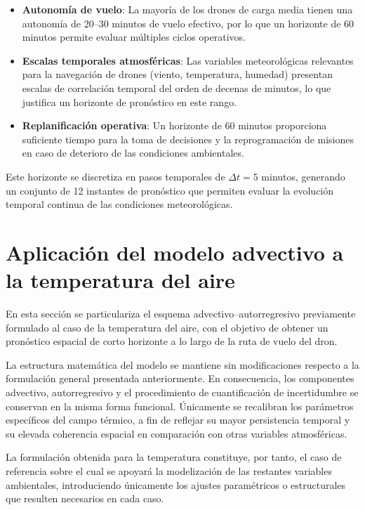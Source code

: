 \documentclass[
  spanish,
  us-letterpaper,
]{scrreprt}
\numberwithin{equation}{section}
\begin{document}
\begin{itemize}
\item
  \textbf{Autonomía de vuelo}: La mayoría de los drones de carga media
  tienen una autonomía de 20--30 minutos de vuelo efectivo, por lo que
  un horizonte de 60 minutos permite evaluar múltiples ciclos
  operativos.
\item
  \textbf{Escalas temporales atmosféricas}: Las variables meteorológicas
  relevantes para la navegación de drones (viento, temperatura, humedad)
  presentan escalas de correlación temporal del orden de decenas de
  minutos, lo que justifica un horizonte de pronóstico en este rango.
\item
  \textbf{Replanificación operativa}: Un horizonte de 60 minutos
  proporciona suficiente tiempo para la toma de decisiones y la
  reprogramación de misiones en caso de deterioro de las condiciones
  ambientales.
\end{itemize}

Este horizonte se discretiza en pasos temporales de \(\Delta t = 5\)
minutos, generando un conjunto de 12 instantes de pronóstico que
permiten evaluar la evolución temporal continua de las condiciones
meteorológicas.

\section{Aplicación del modelo advectivo a la temperatura del
aire}\label{aplicaciuxf3n-del-modelo-advectivo-a-la-temperatura-del-aire}

En esta sección se particulariza el esquema advectivo--autorregresivo
previamente formulado al caso de la temperatura del aire, con el
objetivo de obtener un pronóstico espacial de corto horizonte a lo largo
de la ruta de vuelo del dron.

La estructura matemática del modelo se mantiene sin modificaciones
respecto a la formulación general presentada anteriormente. En
consecuencia, los componentes advectivo, autorregresivo y el
procedimiento de cuantificación de incertidumbre se conservan en la
misma forma funcional. Únicamente se recalibran los parámetros
específicos del campo térmico, a fin de reflejar su mayor persistencia
temporal y su elevada coherencia espacial en comparación con otras
variables atmosféricas.

La formulación obtenida para la temperatura constituye, por tanto, el
caso de referencia sobre el cual se apoyará la modelización de las
restantes variables ambientales, introduciendo únicamente los ajustes
paramétricos o estructurales que resulten necesarios en cada caso.
\end{document}
